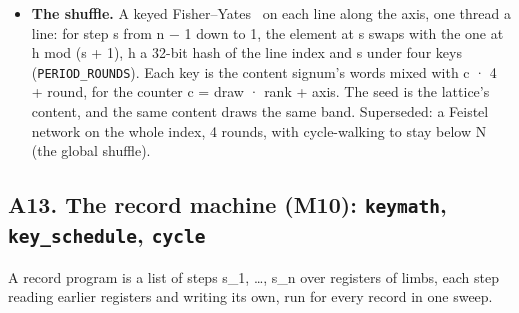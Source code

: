 \begin{itemize}
\item \textbf{The shuffle.} A keyed Fisher–Yates~\cite{src:Fisher} on each line along the axis, one thread a line: for step s from n − 1 down to 1, the element at s swaps with the one at h mod (s + 1), h a 32-bit hash of the line index and s under four keys (\texttt{PERIOD\_\allowbreak{}ROUNDS}). Each key is the content signum's words mixed with c · 4 + round, for the counter c = draw · rank + axis. The seed is the lattice's content, and the same content draws the same band. Superseded: a Feistel network on the whole index, 4 rounds, with cycle-walking to stay below N (the global shuffle).
\end{itemize}

\subsection{\texorpdfstring{A13. The record machine (M10): \texttt{keymath}, \texttt{key\_\allowbreak{}schedule}, \texttt{cycle}}{A13. The record machine (M10): keymath, key\_schedule, cycle}}

A record program is a list of steps s\_\allowbreak{}1, …, s\_\allowbreak{}n over registers of limbs, each step reading earlier registers and writing its own, run for every record in one sweep.

